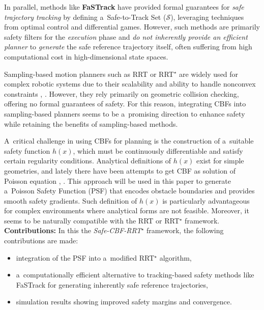 \documentclass{svproc}
\begin{document}
In parallel, methods like \textbf{FaSTrack} \cite{Chen_2021} have
provided formal guarantees for \textit{safe trajectory tracking} by defining
a~Safe-to-Track Set ($\mathcal{S}$), leveraging techniques from optimal control
and differential games. However, such methods are primarily safety filters for
the \textit{execution} phase and \textit{do not inherently provide an efficient planner} to
\textit{generate} the safe reference trajectory itself, often suffering from high
computational cost in high-dimensional state spaces.

Sampling-based motion planners such as RRT or RRT$^\star$ are widely used for complex
robotic systems due to their scalability and ability to handle nonconvex
constraints \cite{LaValle1998RapidlyexploringRT},
\cite{karaman2011samplingbasedalgorithmsoptimalmotion}.
However, they rely primarily on geometric collision checking,
offering no formal guarantees of safety. For this reason, integrating CBFs into
sampling-based planners seems to be a~promising direction to enhance safety while
retaining the benefits of sampling-based methods.

A~critical challenge in using CBFs for planning is the construction of
a~suitable safety function $h(x)$, which must be continuously differentiable
and satisfy certain regularity conditions. Analytical definitions of $h(x)$
exist for simple geometries, and lately there have been attempts to get CBF as
solution of Poisson equation \cite{bahati2025dynamicsafetycomplexenvironments},
\cite{BahatiSafeSS}.
This approach will be used in this paper to generate a~Poisson Safety Function
(PSF) that encodes obstacle boundaries and provides smooth safety gradients.
Such definition of $h(x)$ is particularly advantageous for complex environments where
analytical forms are not feasible. Moreover, it seems to be naturally compatible with
the RRT or RRT$^\star$ framework.
\textbf{Contributions:}
In this the \emph{Safe-CBF-RRT$^\star$} framework, the following contributions are made:
\begin{itemize}
    \item integration of the PSF into a~modified RRT$^\star$ algorithm,
    \item a~computationally efficient alternative to tracking-based safety
    methods
    like FaSTrack for generating inherently safe reference trajectories,
    \item simulation results showing improved safety margins and convergence.
\end{itemize}
\end{document}
